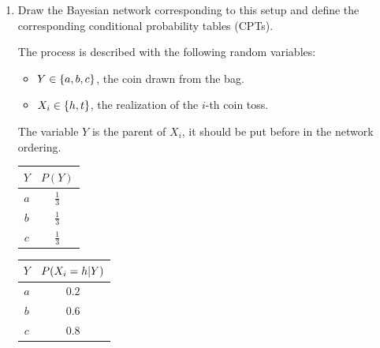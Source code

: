 \documentclass[11pt, a4paper]{article}
\begin{document}
\begin{enumerate}
    \item Draw the Bayesian network corresponding to this setup and define the corresponding conditional probability tables (CPTs).
    
    \begin{solution}
        The process is described with the following random variables:
        \begin{itemize}
            \item $Y \in \{a, b, c\}$, the coin drawn from the bag.
            \item $X_i \in \{h, t\}$, the realization of the $i$-th coin toss.
        \end{itemize}
        The variable $Y$ is the parent of $X_i$, it should be put before in the network ordering.
    
        \begin{center}
        \end{center}
        
        \vspace{1ex}
        
        \begin{minipage}{0.495\textwidth}
            \centering
            \begin{tabular}{c|c}
                \toprule
                 $Y$ & $P(Y)$ \\
                 \midrule
                 $a$ & $\frac{1}{3}$ \\
                 $b$ & $\frac{1}{3}$ \\
                 $c$ & $\frac{1}{3}$ \\
                \bottomrule
            \end{tabular}
        \end{minipage}
        \begin{minipage}{0.495\textwidth}
            \centering
            \begin{tabular}{c|c}
                \toprule
                 $Y$ & $P(X_i = h \vert Y)$ \\
                 \midrule
                 $a$ & $0.2$ \\
                 $b$ & $0.6$ \\
                 $c$ & $0.8$ \\
                \bottomrule
            \end{tabular}
        \end{minipage}
        

\end{solution}
\end{enumerate}
\end{document}

